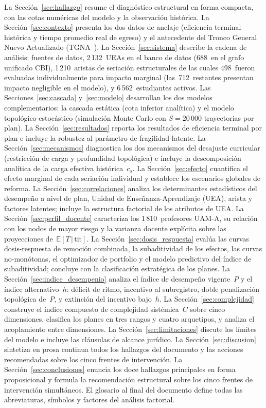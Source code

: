 \documentclass[11pt,letterpaper]{article}
\newcommand{\ETtit}{\mathbb{E}[T\,|\,\mathrm{tit}]}
\begin{document}
La Sección~\ref{sec:hallazgo} resume el diagnóstico estructural en forma
compacta, con las cotas numéricas del modelo y la observación histórica.
La Sección~\ref{sec:contexto} presenta los dos datos de anclaje (eficiencia
terminal histórica y tiempo promedio real de egreso) y el antecedente del
Tronco General Nuevo Actualizado (TGNA~\cite{TGNA2026}).
La Sección~\ref{sec:sistema} describe la cadena de análisis: fuentes de datos,
2\,132~UEAs en el banco de datos (688~en el grafo unificado CBI), 1\,210~aristas de
seriación estructurales de las cuales 498~fueron evaluadas individualmente
para impacto marginal (las~712~restantes presentan impacto negligible en el modelo),
y 6\,562~estudiantes activos.
Las Secciones~\ref{sec:cascada} y~\ref{sec:modelo} desarrollan los dos modelos
complementarios: la cascada estática (cota inferior analítica) y el modelo
topológico-estocástico (simulación Monte Carlo con $S=20\,000$ trayectorias
por plan).
La Sección~\ref{sec:resultados} reporta los resultados de eficiencia terminal
por plan e incluye la robustez al parámetro de fragilidad latente.
La Sección~\ref{sec:mecanismos} diagnostica los dos mecanismos del desajuste
curricular (restricción de carga y profundidad topológica) e incluye la
descomposición analítica de la carga efectiva histórica~$c_s$.
La Sección~\ref{sec:efecto} cuantifica el efecto marginal de cada seriación
individual y establece los escenarios globales de reforma.
La Sección~\ref{sec:correlaciones} analiza los determinantes estadísticos del
desempeño a nivel de plan, Unidad de Enseñanza-Aprendizaje (UEA), arista
y factores latentes; incluye la estructura factorial de los atributos de UEA.
La Sección~\ref{sec:perfil_docente} caracteriza los 1\,810~profesores UAM-A,
su relación con los nodos de mayor riesgo y la varianza docente explícita sobre
las proyecciones de~$\ETtit$.
La Sección~\ref{sec:dosis_respuesta} evalúa las curvas dosis-respuesta de
remoción combinada, la subaditividad de los efectos, las curvas no-monótonas,
el optimizador de portfolio y el modelo predictivo del índice de subaditividad;
concluye con la clasificación estratégica de los planes.
La Sección~\ref{sec:indice_desempenio} analiza el índice de desempeño vigente~$P$
y el índice alternativo~$h$: déficit de ritmo, incentivo al subregistro, doble
penalización topológica de~$P$, y extinción del incentivo bajo~$h$.
La Sección~\ref{sec:complejidad} construye el índice compuesto de complejidad
sistémica~$C$ sobre cinco dimensiones, clasifica los planes en tres rangos y
cuatro arquetipos, y analiza el acoplamiento entre dimensiones.
La Sección~\ref{sec:limitaciones} discute los límites del modelo e incluye las
cláusulas de alcance jurídico.
La Sección~\ref{sec:discusion} sintetiza en prosa continua todos los hallazgos
del documento y las acciones recomendadas sobre los cinco frentes de
intervención.
La Sección~\ref{sec:conclusiones} enuncia los doce hallazgos principales en
forma proposicional y formula la recomendación estructural sobre los cinco
frentes de intervención simultáneos.
El glosario al final del documento define todas las abreviaturas,
símbolos y factores del análisis factorial.
\end{document}
